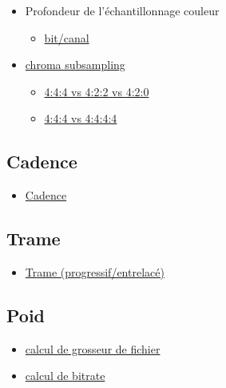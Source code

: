 \documentclass[
]{book}
\providecommand{\tightlist}{%
  \setlength{\itemsep}{0pt}\setlength{\parskip}{0pt}}
\begin{document}
\begin{itemize}
\tightlist
\item
  Profondeur de l'échantillonnage couleur

  \begin{itemize}
  \tightlist
  \item
    \href{https://en.wikipedia.org/wiki/Color_depth}{bit/canal}\\
  \end{itemize}
\item
  \href{https://en.wikipedia.org/wiki/Chroma_subsampling\#Sampling_systems_and_ratios}{chroma subsampling}

  \begin{itemize}
  \tightlist
  \item
    \href{https://upload.wikimedia.org/wikipedia/commons/0/06/Colorcomp.jpg}{4:4:4 vs 4:2:2 vs 4:2:0}
  \item
    \href{https://en.wikipedia.org/wiki/Alpha_compositing}{4:4:4 vs 4:4:4:4}
  \end{itemize}
\end{itemize}

\hypertarget{cadence}{%
\subsection{Cadence}\label{cadence}}

\begin{itemize}
\tightlist
\item
  \href{https://frames-per-second.appspot.com}{Cadence}
\end{itemize}

\hypertarget{trame}{%
\subsection{Trame}\label{trame}}

\begin{itemize}
\tightlist
\item
  \href{https://web.archive.org/web/20140222010640/http://neuron2.net/LVG/interlacing.html}{Trame (progressif/entrelacé)}
\end{itemize}

\hypertarget{poid}{%
\subsection{Poid}\label{poid}}

\begin{itemize}
\tightlist
\item
  \href{https://toolstud.io/video/filesize.php?imagewidth=1920\&imageheight=1080\&framerate=29.97\&timeduration=60\&timeunit=seconds}{calcul de grosseur de fichier}
\item
  \href{https://toolstud.io/video/bitrate.php?imagewidth=1\&imageheight=1\&colordepth=24\&framerate=29.97}{calcul de bitrate}
\end{itemize}
\end{document}
